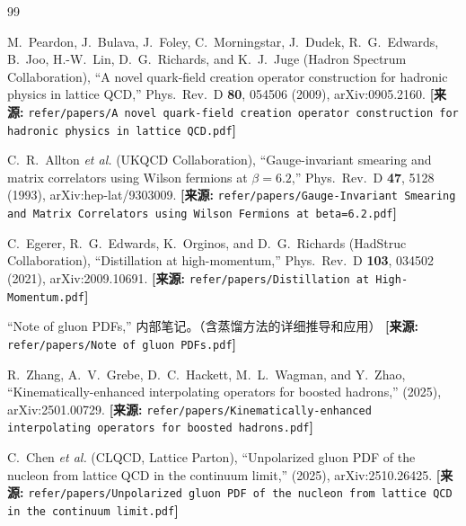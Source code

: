 \documentclass[12pt,a4paper]{ctexart}
\theoremstyle{definition}
\begin{document}
\begin{thebibliography}{99}


M.~Peardon, J.~Bulava, J.~Foley, C.~Morningstar, J.~Dudek, R.~G.~Edwards, B.~Joo, H.-W.~Lin, D.~G.~Richards, and K.~J.~Juge (Hadron Spectrum Collaboration),
``A novel quark-field creation operator construction for hadronic physics in lattice QCD,''
Phys.\ Rev.\ D \textbf{80}, 054506 (2009), arXiv:0905.2160.
\quad\textbf{[来源:} \texttt{refer/papers/A novel quark-field creation operator construction for hadronic physics in lattice QCD.pdf}\textbf{]}


C.~R.~Allton \textit{et al.} (UKQCD Collaboration),
``Gauge-invariant smearing and matrix correlators using Wilson fermions at $\beta=6.2$,''
Phys.\ Rev.\ D \textbf{47}, 5128 (1993), arXiv:hep-lat/9303009.
\quad\textbf{[来源:} \texttt{refer/papers/Gauge-Invariant Smearing and Matrix Correlators using Wilson Fermions at beta=6.2.pdf}\textbf{]}


C.~Egerer, R.~G.~Edwards, K.~Orginos, and D.~G.~Richards (HadStruc Collaboration),
``Distillation at high-momentum,''
Phys.\ Rev.\ D \textbf{103}, 034502 (2021), arXiv:2009.10691.
\quad\textbf{[来源:} \texttt{refer/papers/Distillation at High-Momentum.pdf}\textbf{]}


``Note of gluon PDFs,''
内部笔记。（含蒸馏方法的详细推导和应用）
\quad\textbf{[来源:} \texttt{refer/papers/Note of gluon PDFs.pdf}\textbf{]}


R.~Zhang, A.~V.~Grebe, D.~C.~Hackett, M.~L.~Wagman, and Y.~Zhao,
``Kinematically-enhanced interpolating operators for boosted hadrons,''
(2025), arXiv:2501.00729.
\quad\textbf{[来源:} \texttt{refer/papers/Kinematically-enhanced interpolating operators for boosted hadrons.pdf}\textbf{]}


C.~Chen \textit{et al.} (CLQCD, Lattice Parton),
``Unpolarized gluon PDF of the nucleon from lattice QCD in the continuum limit,''
(2025), arXiv:2510.26425.
\quad\textbf{[来源:} \texttt{refer/papers/Unpolarized gluon PDF of the nucleon from lattice QCD in the continuum limit.pdf}\textbf{]}


\end{thebibliography}
\end{document}
